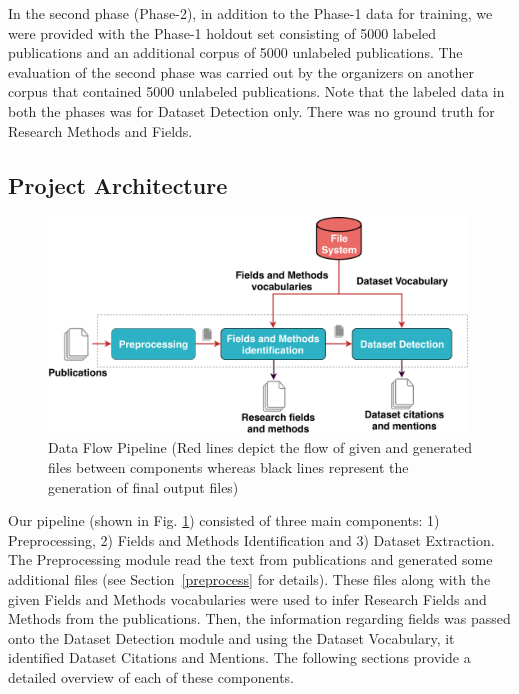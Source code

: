 \documentclass[runningheads]{llncs}
\begin{document}
In the second phase (Phase-2), in addition to the Phase-1 data for training, we were provided with the Phase-1 holdout set consisting of 5000 labeled publications and an additional corpus of 5000 unlabeled publications. The evaluation of the second phase was carried out by the organizers on another corpus that contained 5000 unlabeled publications. Note that the labeled data in both the phases was for Dataset Detection only. There was no ground truth for Research Methods and Fields. 

\subsection{Project Architecture}

\begin{figure}[!htb]
    \centering
    \includegraphics[width=0.99\textwidth]{images/flowchart_paper.pdf}
    \caption{Data Flow Pipeline (Red lines depict the flow of given and generated files between components whereas black lines represent the generation of final output files)}
    \label{fig:flowchart}
\end{figure}

Our pipeline (shown in Fig. \ref{fig:flowchart}) consisted of three main components: 1) Preprocessing, 2) Fields and Methods Identification and 3) Dataset Extraction. The Preprocessing module read the text from publications and generated some additional files (see Section~\ref{preprocess} for details). These files along with the given Fields and Methods vocabularies were used to infer Research Fields and Methods from the publications. Then, the information regarding fields was passed onto the Dataset Detection module and using the Dataset Vocabulary, it identified Dataset Citations and Mentions. The following sections provide a detailed overview of each of these components. 
\end{document}

